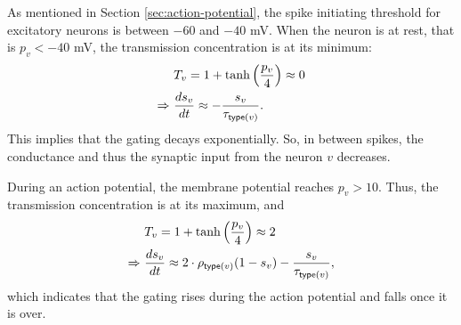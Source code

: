 As mentioned in Section \ref{sec:action-potential}, the spike initiating threshold for excitatory neurons is between $-60$ and $-40$ mV. When the neuron is at rest, that is $p_v < -40$ mV, the transmission concentration is at its minimum:
\begin{gather}
\begin{split}
    & T_v = 1 + \tanh \left( \frac{p_{v}}{4} \right) \approx 0 \\
    \Rightarrow \ & \frac{ds_v}{dt} \approx - \frac{s_v}{\tau_{\mathsf{type}(v)}}.
\end{split}
\end{gather}
This implies that the gating decays exponentially.
So, in between spikes, the conductance and thus the synaptic input from the neuron $v$ decreases. 

During an action potential, the membrane potential reaches $p_v > 10$. Thus, the transmission concentration is at its maximum, and
\begin{gather}
\begin{split}
    & T_v = 1 + \tanh \left( \frac{p_{v}}{4} \right) \approx 2 \\
    \Rightarrow \ & \frac{ds_v}{dt} \approx 2 \cdot \rho_{\mathsf{type}(v)} (1 - s_v) - \frac{s_v}{\tau_{\mathsf{type}(v)}},
\end{split}
\end{gather}
which indicates that the gating rises during the action potential and falls once it is over. 